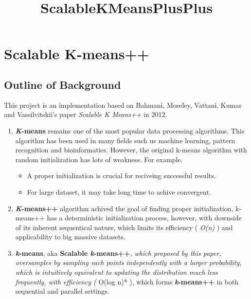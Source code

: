 \documentclass{article}
\title{ScalableKMeansPlusPlus}
\begin{document}
    
    
    \maketitle
    
    

    
    \section{Scalable K-means++}\label{scalable-k-means}

    \subsection{Outline of Background}\label{outline-of-background}

    This project is an implementation based on Bahmani, Moseley, Vattani,
Kumar and Vassilvitskii's paper \emph{Scalable K Means++} in 2012.

\begin{enumerate}
\def\labelenumi{\arabic{enumi}.}
\item
  \textbf{\emph{K}-means} remains one of the most popular data
  processing algorithms. This algorithm has been used in many fields
  such us machine learning, pattern recognition and bioinformatics.
  However, the original k-means algorithm with random initialization has
  lots of weakness. For example.

  \begin{itemize}
  \itemsep1pt\parskip0pt
  \item
    A proper initialization is crucial for reciveing successful results.
  \item
    For large dataset, it may take long time to achive convergent.
  \end{itemize}
\item
  \textbf{\emph{K}-means++} algorithm achived the goal of finding proper
  initialization, k-means++ has a deterministic initialization process,
  however, with downside of its inherent sequentical nature, which
  limits its efficiency ( \emph{O(n)} ) and applicability to big massive
  datasets.
\item
  \textbf{\emph{k}-means\textbar{}\textbar{}}, aka \textbf{Scalable
  \emph{k}-means++}\emph{, which proposed by this paper, oversamples by
  sampling each points independently with a larger probability, which is
  intuitively equivalent to updating the distribution much less
  frequently, with efficiency ( }O(log n)* ), which forms
  \textbf{\emph{k}-means++} in both sequential and parallel settings.
\end{enumerate}
\end{document}
